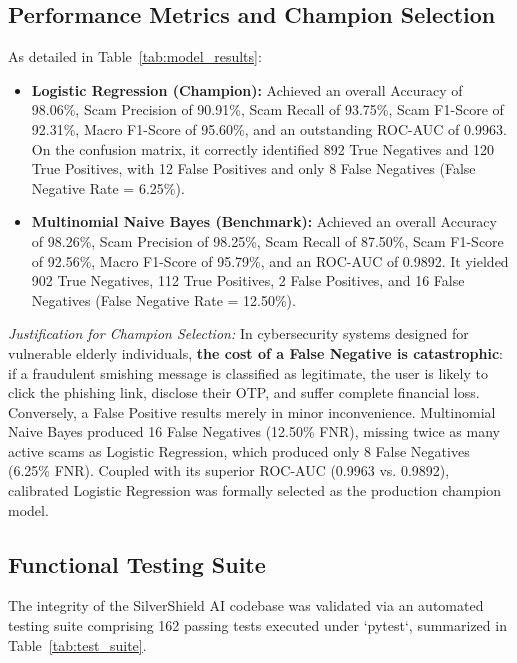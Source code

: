 \documentclass[conference]{IEEEtran}
\begin{document}
\subsection{Performance Metrics and Champion Selection}
As detailed in Table~\ref{tab:model_results}:
\begin{itemize}
    \item \textbf{Logistic Regression (Champion):} Achieved an overall Accuracy of 98.06\%, Scam Precision of 90.91\%, Scam Recall of 93.75\%, Scam F1-Score of 92.31\%, Macro F1-Score of 95.60\%, and an outstanding ROC-AUC of 0.9963. On the confusion matrix, it correctly identified 892 True Negatives and 120 True Positives, with 12 False Positives and only 8 False Negatives (False Negative Rate = 6.25\%).
    \item \textbf{Multinomial Naive Bayes (Benchmark):} Achieved an overall Accuracy of 98.26\%, Scam Precision of 98.25\%, Scam Recall of 87.50\%, Scam F1-Score of 92.56\%, Macro F1-Score of 95.79\%, and an ROC-AUC of 0.9892. It yielded 902 True Negatives, 112 True Positives, 2 False Positives, and 16 False Negatives (False Negative Rate = 12.50\%).
\end{itemize}

\textit{Justification for Champion Selection:} In cybersecurity systems designed for vulnerable elderly individuals, \textbf{the cost of a False Negative is catastrophic}: if a fraudulent smishing message is classified as legitimate, the user is likely to click the phishing link, disclose their OTP, and suffer complete financial loss. Conversely, a False Positive results merely in minor inconvenience. Multinomial Naive Bayes produced 16 False Negatives (12.50\% FNR), missing twice as many active scams as Logistic Regression, which produced only 8 False Negatives (6.25\% FNR). Coupled with its superior ROC-AUC (0.9963 vs. 0.9892), calibrated Logistic Regression was formally selected as the production champion model.

\subsection{Functional Testing Suite}
The integrity of the SilverShield AI codebase was validated via an automated testing suite comprising 162 passing tests executed under `pytest`, summarized in Table~\ref{tab:test_suite}.
\end{document}
